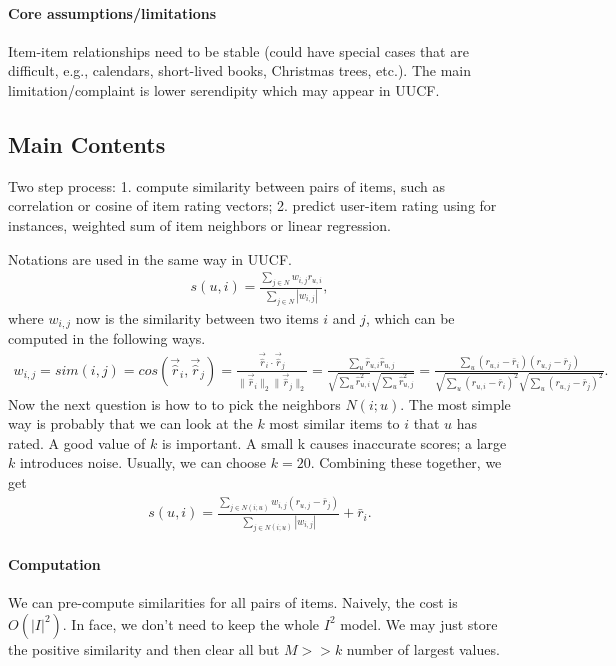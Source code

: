 \documentclass{article}
\theoremstyle{definition}
\begin{document}
\paragraph{Core assumptions/limitations} Item-item relationships need to be stable (could have special cases that are difficult, e.g., calendars, short-lived books, Christmas trees, etc.). The main limitation/complaint is lower serendipity which may appear in UUCF. 

\subsection{Main Contents}
Two step process: 1. compute similarity between pairs of items, such as correlation or cosine of item rating vectors; 2. predict user-item rating using for instances, weighted sum of item neighbors or linear regression.

Notations are used in the same way in UUCF.
\begin{align*}
    s(u,i) = \frac{\sum_{j \in N} w_{i,j} r_{u,i}}{\sum_{j \in N} |w_{i,j}|},
\end{align*}
where $w_{i,j}$ now is the similarity between two items $i$ and $j$, which can be computed in the following ways.
\begin{align*}
    w_{i,j} = sim(i,j) = cos(\vec{\hat{r}}_i, \vec{\hat{r}}_j) = \frac{\vec{\hat{r}}_i \cdot \vec{\hat{r}}_j}{\|\vec{\hat{r}}_i\|_2 \|\vec{\hat{r}}_j\|_2} = \frac{\sum_u \hat{r}_{u,i} \hat{r}_{u,j}}{\sqrt{\sum_u \hat{r}_{u,i}^2}\sqrt{\sum_u \hat{r}_{u,j}^2}} = \frac{\sum_u (r_{u,i}-\bar{r}_i) (r_{u,j}-\bar{r}_j)}{\sqrt{\sum_u (r_{u,i}-\bar{r}_i)^2}\sqrt{\sum_u (r_{u,j}-\bar{r}_j)^2}}.
\end{align*}
Now the next question is how to to pick the neighbors $N(i;u)$. The most simple way is probably that we can look at the $k$ most similar items to $i$ that $u$ has rated. A good value of $k$ is important. A small k causes inaccurate scores; a large $k$ introduces noise. Usually, we can choose $k=20$. Combining these together, we get 
\begin{align*}
    s(u,i) = \frac{\sum_{j \in N(i;u)} w_{i,j} (r_{u,j} - \bar{r}_j)}{\sum_{j \in N(i;u)}|w_{i,j}|} + \bar{r}_i.
\end{align*}

\paragraph{Computation} We can pre-compute similarities for all pairs of items. Naively, the cost is $O(|I|^2)$. In face, we don't need to keep the whole $I^2$ model. We may just store the positive similarity and then clear all but $M >> k$ number of largest values.
\end{document}
